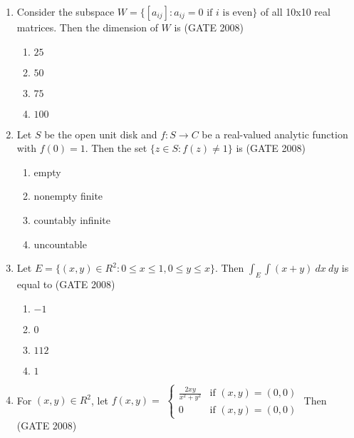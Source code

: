 \documentclass[journal]{IEEEtran}
\begin{document}
\begin{enumerate}
    

\item {Consider the subspace $W=\{[a_{ij}]: a_{ij}=0 \text{ if } i \text{ is even}\}$ of all 10x10 real matrices. Then the dimension of $W$ is \hfill (GATE 2008)

\begin{multicols}{4}
    \begin{enumerate}
        \item $25$
        \item $50$
        \item $75$
        \item $100$
    \end{enumerate}
\end{multicols}}

\item { Let $S$ be the open unit disk and $f: S\rightarrow C$ be a real-valued analytic function with $f(0) = 1$. Then the set $\{z \in S: f(z) \ne 1\}$ is \hfill (GATE 2008)

\begin{multicols}{2}
    \begin{enumerate}
        \item{empty}
        \item{nonempty finite }
        \item{countably infinite}
        \item{uncountable}
    \end{enumerate}
\end{multicols}
}

\item{ Let $E=\{(x,y)\in R^2:0\leq x\leq1,0\leq y\leq x\}$. Then $\int_E\int(x+y) \: dx \: dy$ is equal to \hfill (GATE 2008)
\begin{multicols}{4}
\begin{enumerate}
    \item $-1$
    \item $0$
    \item $112$
    \item $1$
\end{enumerate}
\end{multicols}
}

\item {
For $(x, y) \in R^2$, let
$f(x,y) =$ $\begin{cases}\frac{2xy}{x^2+y^2} & \text{if } (x,y)=(0,0)\\
    0 & \text{if } (x, y)=(0,0)
\end{cases}$
Then \hfill (GATE 2008)

}
\end{enumerate}
\end{document}
